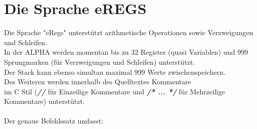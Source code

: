 \documentclass{article}
\begin{document}
\section{Die Sprache eREGS}
\label{sec:eregsLang}
Die Sprache "eRegs" unterstützt arithmetische Operationen sowie Verzweigungen und Schleifen.\\
In der ALPHA werden momentan bis zu 32 Register (quasi Variablen) und 999 Sprungmarken (für Verzweigungen und Schleifen) unterstützt.\\
Der Stack kann ebenso simultan maximal 999 Werte zwischenspeichern.\\
Des Weiteren werden innerhalb des Quelltextes Kommentare\\ im C Stil (\textit{\textbf{//}} für Einzeilige Kommentare und \textit{\textbf{/* ... */}} für Mehrzeilige Kommentare) unterstützt.\\\\
Der genaue Befehlssatz umfasst:\\\\
\end{document}
